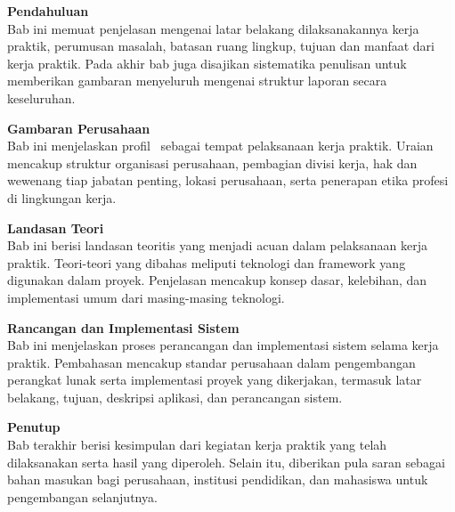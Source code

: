 
\vspace{0.3cm}
\begin{description}[leftmargin=2.2cm, labelsep=0cm, itemsep=0.1cm]
  \item[{\makebox[2.2cm][l]{\textbf{BAB 1}}}] \textbf{Pendahuluan}\\
    Bab ini memuat penjelasan mengenai latar belakang dilaksanakannya kerja
    praktik, perumusan masalah, batasan ruang lingkup, tujuan dan manfaat dari
    kerja praktik. Pada akhir bab juga disajikan sistematika penulisan untuk
    memberikan gambaran menyeluruh mengenai struktur laporan secara keseluruhan.

  \item[{\makebox[2.2cm][l]{\textbf{BAB 2}}}] \textbf{Gambaran Perusahaan}\\
    Bab ini menjelaskan profil \NamaPerusahaan\ sebagai tempat pelaksanaan
    kerja praktik. Uraian mencakup struktur organisasi perusahaan, pembagian
    divisi kerja, hak dan wewenang tiap jabatan penting, lokasi perusahaan,
    serta penerapan etika profesi di lingkungan kerja.

  \item[{\makebox[2.2cm][l]{\textbf{BAB 3}}}] \textbf{Landasan Teori}\\
    Bab ini berisi landasan teoritis yang menjadi acuan dalam pelaksanaan kerja
    praktik. Teori-teori yang dibahas meliputi teknologi dan framework yang
    digunakan dalam proyek. Penjelasan mencakup konsep dasar, kelebihan, dan
    implementasi umum dari masing-masing teknologi.

  \item[{\makebox[2.2cm][l]{\textbf{BAB 4}}}] \textbf{Rancangan dan Implementasi Sistem}\\
    Bab ini menjelaskan proses perancangan dan implementasi sistem selama kerja
    praktik. Pembahasan mencakup standar perusahaan dalam pengembangan perangkat
    lunak serta implementasi proyek yang dikerjakan, termasuk latar belakang,
    tujuan, deskripsi aplikasi, dan perancangan sistem.

  \item[{\makebox[2.2cm][l]{\textbf{BAB 5}}}] \textbf{Penutup}\\
    Bab terakhir berisi kesimpulan dari kegiatan kerja praktik yang telah
    dilaksanakan serta hasil yang diperoleh. Selain itu, diberikan pula saran
    sebagai bahan masukan bagi perusahaan, institusi pendidikan, dan mahasiswa
    untuk pengembangan selanjutnya.
\end{description}
